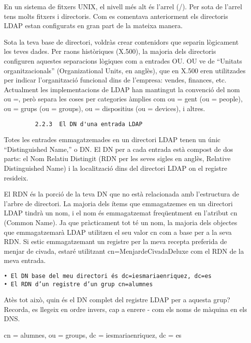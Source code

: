 \documentclass[
  12 pt,
  a4paper,
]{article}
\begin{document}
En un sistema de fitxers UNIX, el nivell més alt és l'arrel (/). Per
sota de l'arrel tens molts fitxers i directoris. Com es comentava
anteriorment els directoris LDAP estan configurats en gran part de la
mateixa manera.

Sota la teva base de directori, voldràs crear contenidors que separin
lògicament les teves dades. Per raons històriques (X.500), la majoria
dels directoris configuren aquestes separacions lògiques com a entrades
OU. OU ve de ``Unitats organitzacionals'' (Organizational Units, en
anglès), que en X.500 eren utilitzades per indicar l'organització
funcional dins de l'empresa: vendes, finances, etc. Actualment les
implementacions de LDAP han mantingut la convenció del nom ou =, però
separa les coses per categories àmplies com ou = gent (ou = people), ou
= grups (ou = groups), ou = dispositius (ou = devices), i altres.

\begin{verbatim}
         2.2.3  El DN d'una entrada LDAP
\end{verbatim}

Totes les entrades emmagatzemades en un directori LDAP tenen un únic
``Distinguished Name,'' o DN. El DN per a cada entrada està compost de
dos parts: el Nom Relatiu Distingit (RDN per les seves sigles en anglès,
Relative Distinguished Name) i la localització dins del directori LDAP
on el registre resideix.

El RDN és la porció de la teva DN que no està relacionada amb
l'estructura de l'arbre de directori. La majoria dels ítems que
emmagatzemes en un directori LDAP tindrà un nom, i el nom és
emmagatzemat freqüentment en l'atribut cn (Common Name). Ja que
pràcticament tot té un nom, la majoria dels objectes que emmagatzemarà
LDAP utilitzen el seu valor cn com a base per a la seva RDN. Si estic
emmagatzemant un registre per la meva recepta preferida de menjar de
civada, estaré utilitzant cn=MenjardeCivadaDeluxe com el RDN de la meva
entrada.

\begin{verbatim}
• El DN base del meu directori és dc=iesmariaenriquez, dc=es
• El RDN d’un registre d’un grup cn=alumnes
\end{verbatim}

Atès tot això, quin és el DN complet del registre LDAP per a aquesta
grup? Recorda, es llegeix en ordre invers, cap a enrere - com els noms
de màquina en els DNS.

cn = alumnes, ou = groups, dc = iesmariaenriquez, dc = es
\end{document}
